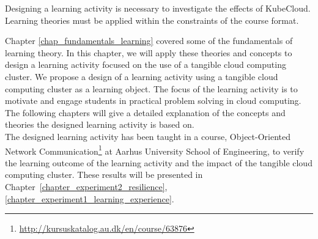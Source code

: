 \begin{theorem}
Designing a learning activity is necessary to investigate the effects of KubeCloud. Learning theories must be applied within the constraints of the course format.
\end{theorem}

\noindent
Chapter \ref{chap_fundamentals_learning} covered some of the fundamentals of learning theory. In this chapter, we will apply these theories and concepts to design a learning activity focused on the use of a tangible cloud computing cluster. We propose a design of a learning activity using a tangible cloud computing cluster as a learning object. The focus of the learning activity is to motivate and engage students in practical problem solving in cloud computing. The following chapters will give a detailed explanation of the concepts and theories the designed learning activity is based on. \\

\noindent 
The designed learning activity has been taught in a course, Object-Oriented Network Communication\footnote{\url{http://kursuskatalog.au.dk/en/course/63876}} at Aarhus University School of Engineering,  to verify the learning outcome of the learning activity and the impact of the tangible cloud computing cluster. These results will be presented in Chapter~\ref{chapter_experiment2_resilience}, \ref{chapter_experiment1_learning_experience}.